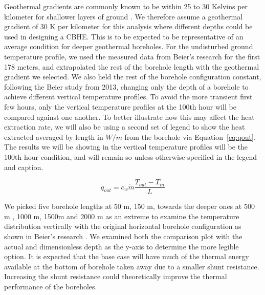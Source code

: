         Geothermal gradients are commonly known to be within 25 to 30 Kelvins per kilometer for shallower layers of ground \cite{holmberg_thermal_2016}. We therefore assume a geothermal gradient of  30 K per kilometer for this analysis where different depths could be used in designing a CBHE\cite{shrestha_assessment_2018}. This is to be expected to be representative of an average condition for deeper geothermal boreholes. For the undisturbed ground temperature profile, we used the measured data from Beier's research for the first 178 meters, and extrapolated the rest of the borehole length with the geothermal gradient we selected. We also held the rest of the borehole configuration constant, following the Beier study from 2013, changing only the depth of a borehole to achieve different vertical temperature profiles. To avoid the more transient first few hours, only the vertical temperature profiles at the 100th hour will be compared against one another. To better illustrate how this may affect the heat extraction rate, we will also be using a second set of legend to show the heat extracted averaged by length in $W/m$ from the borehole via Equation~\ref{eq:qout}. The results we will be showing in the vertical temperature profiles will be the 100th hour condition, and will remain so unless otherwise specified in the legend and caption. 
            
                \begin{equation}
                    q_{out}=c_w\dot m \frac{T_{out}-T_{in}}{L}\label{eq:qout}
                \end{equation}
                     
        We picked five borehole lengths at 50 m, 150 m, towards the deeper ones at 500 m , 1000 m, 1500m and 2000 m as an extreme to examine the temperature distribution vertically with the original horizontal borehole configuration as shown in Beier's research \cite{beier2013}. We examined both the comparison plot with the actual and dimensionless depth as the y-axis to determine the more legible option. It is expected that the base case will have much of the thermal energy available at the bottom of borehole taken away due to a smaller shunt resistance. Increasing the shunt resistance could theoretically improve the thermal performance of the boreholes.
            
